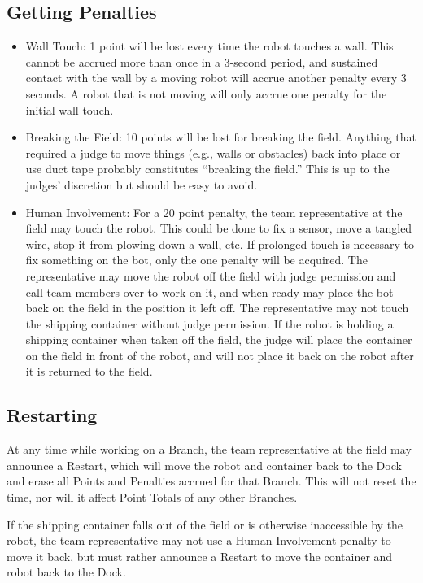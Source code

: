 \documentclass[a4paper,12pt]{article}
\begin{document}
\subsection{Getting Penalties}
\begin{itemize}
    \item Wall Touch: 1 point will be lost every time the robot touches a wall. This cannot be accrued more than once in a 3-second period, and sustained contact with the wall by a moving robot will accrue another penalty every 3 seconds. A robot that is not moving will only accrue one penalty for the initial wall touch.
    \item Breaking the Field: 10 points will be lost for breaking the field. Anything that required a judge to move things (e.g., walls or obstacles) back into place or use duct tape probably constitutes “breaking the field.” This is up to the judges’ discretion but should be easy to avoid. 
    \item Human Involvement: For a 20 point penalty, the team representative at the field may touch the robot. This could be done to fix a sensor, move a tangled wire, stop it from plowing down a wall, etc. If prolonged touch is necessary to fix something on the bot, only the one penalty will be acquired. The representative may move the robot off the field with judge permission and call team members over to work on it, and when ready may place the bot back on the field in the position it left off. The representative may not touch the shipping container without judge permission. If the robot is holding a shipping container when taken off the field, the judge will place the container on the field in front of the robot, and will not place it back on the robot after it is returned to the field. 

\end{itemize}

\subsection{Restarting}
At any time while working on a Branch, the team representative at the field may announce a Restart, which will move the robot and container back to the Dock and erase all Points and Penalties accrued for that Branch. This will not reset the time, nor will it affect Point Totals of any other Branches. \newline

\noindent
If the shipping container falls out of the field or is otherwise inaccessible by the robot, the team representative may not use a Human Involvement penalty to move it back, but must rather announce a Restart to move the container and robot back to the Dock.
\end{document}
